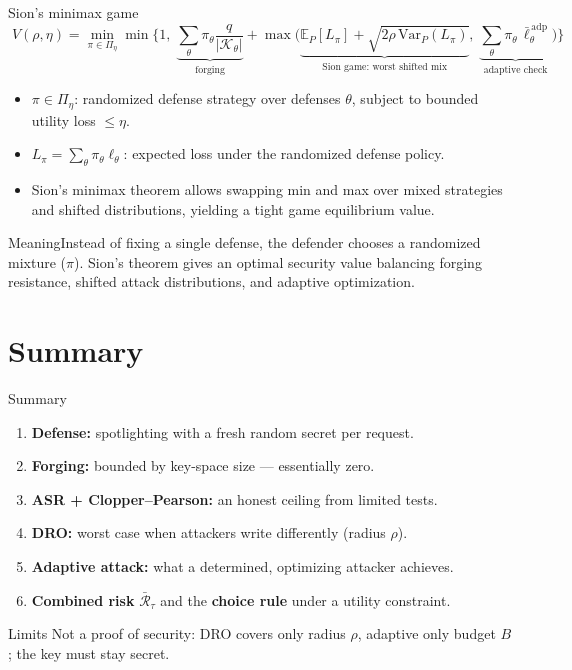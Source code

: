\documentclass[aspectratio=169,11pt]{beamer}
\newcommand{\plain}[1]{\begin{block}{Meaning}#1\end{block}}
\begin{document}
\begin{frame}{Sion's minimax game}
  \[
    \boxed{\;
    V(\rho,\eta) = \min_{\pi \in \Pi_\eta} \min\Bigg\{1,\;
    \underbrace{\sum_\theta \pi_\theta \frac{q}{|\mathcal{K}_\theta|}}_{\text{forging}}
    + \max\Big(
    \underbrace{\mathbb{E}_P[L_\pi] + \sqrt{2\rho\,\mathrm{Var}_P(L_\pi)}}_{\text{Sion game: worst shifted mix}},\;
    \underbrace{\sum_\theta \pi_\theta\, \bar\ell^{\,\mathrm{adp}}_\theta}_{\text{adaptive check}}
    \Big)\Bigg\}\;}
  \]
  \small
  \begin{itemize}
    \item $\pi \in \Pi_\eta$: randomized defense strategy over defenses $\theta$, subject to bounded utility loss $\le \eta$.
    \item $L_\pi = \sum_\theta \pi_\theta \ell_\theta$: expected loss under the randomized defense policy.
    \item Sion's minimax theorem allows swapping min and max over mixed strategies and shifted distributions, yielding a tight game equilibrium value.
  \end{itemize}
  \plain{Instead of fixing a single defense, the defender chooses a randomized mixture ($\pi$). Sion's theorem gives an optimal security value balancing forging resistance, shifted attack distributions, and adaptive optimization.}
\end{frame}

\section{Summary}

\begin{frame}{Summary}
  \begin{enumerate}
    \item \textbf{Defense:} spotlighting with a fresh random secret per request.
    \item \textbf{Forging:} bounded by key-space size --- essentially zero.
    \item \textbf{ASR + Clopper--Pearson:} an honest ceiling from limited tests.
    \item \textbf{DRO:} worst case when attackers write differently (radius $\rho$).
    \item \textbf{Adaptive attack:} what a determined, optimizing attacker achieves.
    \item \textbf{Combined risk} $\bar{\mathcal{R}}_\tau$ and the \textbf{choice rule} under a utility constraint.
  \end{enumerate}
  \begin{alertblock}{Limits}
    Not a proof of security: DRO covers only radius $\rho$, adaptive only budget $B$; the key must stay secret.
  \end{alertblock}
\end{frame}
\end{document}
